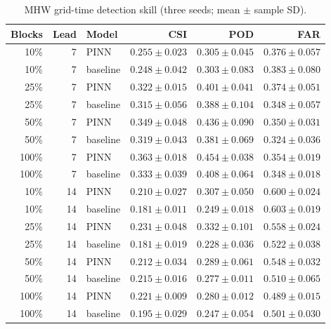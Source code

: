 \begin{table}[t]
\centering
\caption{MHW grid-time detection skill (three seeds; mean $\pm$ sample SD).}
\label{tab:table_mhw}
\small
\begin{tabular}{rrlrrr}
\toprule
Blocks & Lead & Model & CSI & POD & FAR \\
\midrule
10\% & 7 & PINN & $0.255 \pm 0.023$ & $0.305 \pm 0.045$ & $0.376 \pm 0.057$ \\
10\% & 7 & baseline & $0.248 \pm 0.042$ & $0.303 \pm 0.083$ & $0.383 \pm 0.080$ \\
25\% & 7 & PINN & $0.322 \pm 0.015$ & $0.401 \pm 0.041$ & $0.374 \pm 0.051$ \\
25\% & 7 & baseline & $0.315 \pm 0.056$ & $0.388 \pm 0.104$ & $0.348 \pm 0.057$ \\
50\% & 7 & PINN & $0.349 \pm 0.048$ & $0.436 \pm 0.090$ & $0.350 \pm 0.031$ \\
50\% & 7 & baseline & $0.319 \pm 0.043$ & $0.381 \pm 0.069$ & $0.324 \pm 0.036$ \\
100\% & 7 & PINN & $0.363 \pm 0.018$ & $0.454 \pm 0.038$ & $0.354 \pm 0.019$ \\
100\% & 7 & baseline & $0.333 \pm 0.039$ & $0.408 \pm 0.064$ & $0.348 \pm 0.018$ \\
10\% & 14 & PINN & $0.210 \pm 0.027$ & $0.307 \pm 0.050$ & $0.600 \pm 0.024$ \\
10\% & 14 & baseline & $0.181 \pm 0.011$ & $0.249 \pm 0.018$ & $0.603 \pm 0.019$ \\
25\% & 14 & PINN & $0.231 \pm 0.048$ & $0.332 \pm 0.101$ & $0.558 \pm 0.024$ \\
25\% & 14 & baseline & $0.181 \pm 0.019$ & $0.228 \pm 0.036$ & $0.522 \pm 0.038$ \\
50\% & 14 & PINN & $0.212 \pm 0.034$ & $0.289 \pm 0.061$ & $0.548 \pm 0.032$ \\
50\% & 14 & baseline & $0.215 \pm 0.016$ & $0.277 \pm 0.011$ & $0.510 \pm 0.065$ \\
100\% & 14 & PINN & $0.221 \pm 0.009$ & $0.280 \pm 0.012$ & $0.489 \pm 0.015$ \\
100\% & 14 & baseline & $0.195 \pm 0.029$ & $0.247 \pm 0.054$ & $0.501 \pm 0.030$ \\
\bottomrule
\end{tabular}
\end{table}
